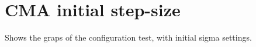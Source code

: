 \section{CMA initial step-size}

Shows the graps of the configuration test, with initial sigma
settings.

